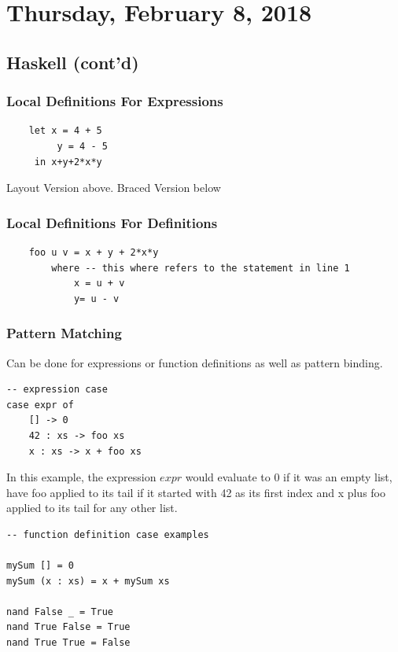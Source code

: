 \documentclass[12pt]{article}
\begin{document}
\newpage

\section{Thursday, February 8, 2018}

\subsection{Haskell (cont'd)}

\subsubsection{Local Definitions For Expressions}

\begin{lstlisting}
	let x = 4 + 5
	     y = 4 - 5
	 in x+y+2*x*y
\end{lstlisting}

Layout Version above. Braced Version below

\subsubsection{Local Definitions For Definitions}

\begin{lstlisting}
	foo u v = x + y + 2*x*y
		where -- this where refers to the statement in line 1
			x = u + v
			y= u - v
\end{lstlisting}

\subsubsection{Pattern Matching}

Can be done for expressions or function definitions as well as pattern binding.

\begin{lstlisting}
-- expression case
case expr of
	[] -> 0
	42 : xs -> foo xs
	x : xs -> x + foo xs
\end{lstlisting}

In this example, the expression $expr$ would evaluate to 0 if it was an empty list, have foo applied to its tail if it started with 42 as its first index and x plus foo applied to its tail for any other list.

\begin{lstlisting}
-- function definition case examples

mySum [] = 0
mySum (x : xs) = x + mySum xs

nand False _ = True
nand True False = True
nand True True = False
\end{lstlisting}
\end{document}
